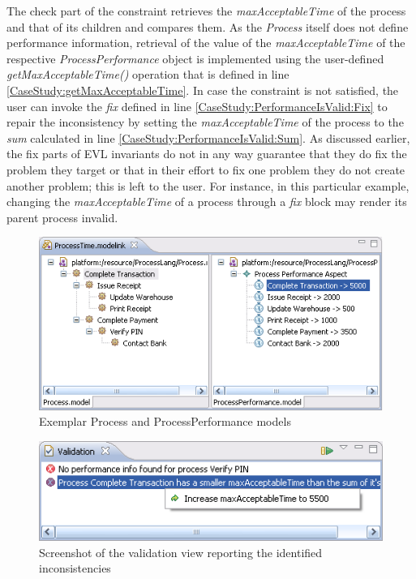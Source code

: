 The check part of the constraint retrieves the \emph{maxAcceptableTime} of the process and that of its children and compares them. As the \emph{Process} itself does not define performance information, retrieval of the value of the \emph{maxAcceptableTime} of the respective \emph{ProcessPerformance} object is implemented using the user-defined \emph{getMaxAcceptableTime()} operation that is defined in line \ref{CaseStudy:getMaxAcceptableTime}. In case the constraint is not satisfied, the user can invoke the \emph{fix} defined in line \ref{CaseStudy:PerformanceIsValid:Fix} to repair the inconsistency by setting the \emph{maxAcceptableTime} of the process to the \emph{sum} calculated in line \ref{CaseStudy:PerformanceIsValid:Sum}. As discussed earlier, the fix parts of EVL invariants do not in any way guarantee that they do fix the problem they target or that in their effort to fix one problem they do not create another problem; this is left to the user. For instance, in this particular example, changing the \emph{maxAcceptableTime} of a process through a \emph{fix} block may render its parent process invalid.

\begin{figure}
	\centering
		\includegraphics{images/ModeLink.png}
	\caption{Exemplar Process and ProcessPerformance models}
	\label{fig:ModeLink}
\end{figure}

\begin{figure}
	\centering
		\includegraphics{images/Validation.png}
	\caption{Screenshot of the validation view reporting the identified inconsistencies}
	\label{fig:Validation}
\end{figure}

